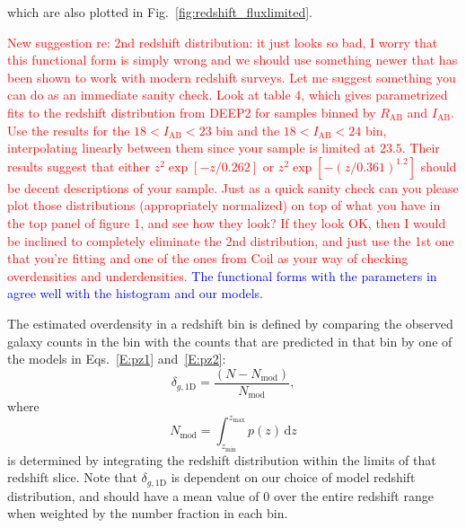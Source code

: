 \documentclass[twocolumn,useAMS,usenatbib]{mn2e}
\newcommand{\rachel}[1]{{\textcolor{red}{#1}}}
\newcommand{\arun}[1]{{\textcolor{blue}{#1}}}
\begin{document}
which are also plotted in Fig.~\ref{fig:redshift_fluxlimited}.


\rachel{New suggestion re: 2nd redshift distribution: it just looks so
  bad, I worry that this functional form is simply wrong 
  and we should use something newer that has been shown to work with
  modern redshift surveys.  Let me suggest something you can
  do as an immediate sanity check.   Look at
  \cite{2004ApJ...617..765C} table 4, which gives parametrized fits to
  the redshift distribution from DEEP2 for samples binned by
  $R_\text{AB}$ and $I_\text{AB}$.  Use the results for the
  $18<I_\text{AB}<23$ bin and the $18<I_\text{AB}<24$ bin,
  interpolating linearly between them since your sample is limited at
  $23.5$.  Their results suggest that either $z^2 \exp{[-z/0.262]}$ or
  $z^2 \exp{[-(z/0.361)^{1.2}]}$ should be decent descriptions of your sample.  Just as a quick
  sanity check can you please plot those  distributions (appropriately
  normalized) on top of what you have in the top panel of figure 1,
  and see how they look?  If they look OK, then I would be inclined to
  completely eliminate the 2nd distribution, and just use the 1st one
  that you're fitting and one of the ones from Coil as your way of
  checking overdensities and underdensities.
} \arun{The functional forms with the parameters in  \cite{2004ApJ...617..765C} agree well with the histogram and our models.}

The estimated overdensity in a redshift bin is defined by comparing
the observed galaxy counts in the bin with the counts that are
predicted in that bin by one of the models in Eqs.~\eqref{E:pz1}
and~\eqref{E:pz2}:
\begin{equation}
\delta_{g,\text{1D}}=\frac{(N-N_{\text{mod}})}{N_{\text{mod}}},
\end{equation}
where
\begin{equation}
N_\text{mod} = \int_{z_\text{min}}^{z_\text{max}} p(z) \,\mathrm{d}z
\end{equation}
is determined by integrating the redshift distribution within the
limits of that redshift slice. 
Note that $\delta_{g,\text{1D}}$ is dependent on our choice of model
redshift distribution, and should have a mean value of $0$ over the
entire redshift range when weighted by the number fraction in each bin.
\end{document}
